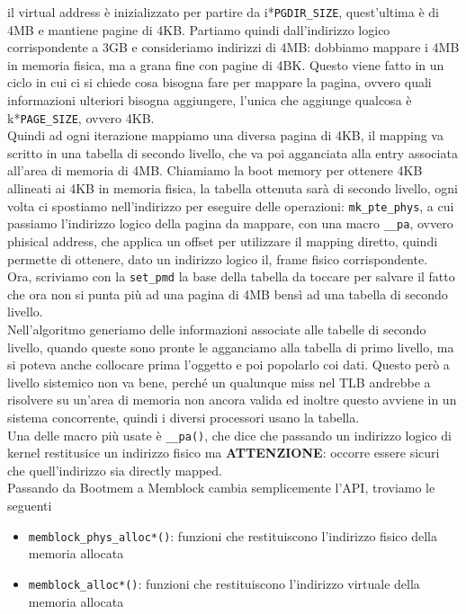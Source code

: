 \documentclass[12pt, oneside]{extbook}
\begin{document}
il virtual address è inizializzato per partire da i*\texttt{PGDIR\_SIZE}, quest'ultima è di 4MB e mantiene pagine di 4KB. Partiamo quindi dall'indirizzo logico corrispondente a 3GB e consideriamo indirizzi di 4MB: dobbiamo mappare i 4MB in memoria fisica, ma a grana fine con pagine di 4BK. Questo viene fatto in un ciclo in cui ci si chiede cosa bisogna fare per mappare la pagina, ovvero quali informazioni ulteriori bisogna aggiungere, l'unica che aggiunge qualcosa è k*\texttt{PAGE\_SIZE}, ovvero 4KB.\\Quindi ad ogni iterazione mappiamo una diversa pagina di 4KB, il mapping va scritto in una tabella di secondo livello, che va poi agganciata alla entry associata all'area di memoria di 4MB. Chiamiamo la boot memory per ottenere 4KB allineati ai 4KB in memoria fisica, la tabella ottenuta sarà di secondo livello, ogni volta ci spostiamo nell'indirizzo per eseguire delle operazioni: \texttt{mk\_pte\_phys}, a cui passiamo l'indirizzo logico della pagina da mappare, con una macro \texttt{\_\_pa}, ovvero phisical address, che applica un offset per utilizzare il mapping diretto, quindi permette di ottenere, dato un indirizzo logico il, frame fisico corrispondente.\\ Ora, scriviamo con la \texttt{set\_pmd} la base della tabella da toccare per salvare il fatto che ora non si punta più ad una pagina di 4MB bensì ad una tabella di secondo livello.\\ Nell'algoritmo generiamo delle informazioni associate alle tabelle di secondo livello, quando queste sono pronte le agganciamo alla tabella di primo livello, ma si poteva anche collocare prima l'oggetto e poi popolarlo coi dati. Questo però a livello sistemico non va bene, perché un qualunque miss nel TLB andrebbe a risolvere su un'area di memoria non ancora valida ed inoltre questo avviene in un sistema concorrente, quindi i diversi processori usano la tabella.\\ Una delle macro più usate è \texttt{\_\_pa()}, che dice che passando un indirizzo logico di kernel restitusice un indirizzo fisico ma \textbf{ATTENZIONE}: occorre essere sicuri che quell'indirizzo sia directly mapped.\\ Passando da Bootmem a Memblock cambia semplicemente l'API, troviamo le seguenti
\begin{itemize}
	\item[] \texttt{memblock\_phys\_alloc*()}: funzioni che restituiscono l'indirizzo fisico della memoria allocata
	\item[] \texttt{memblock\_alloc*()}: funzioni che restituiscono l'indirizzo virtuale della memoria allocata
\end{itemize}
\end{document}
